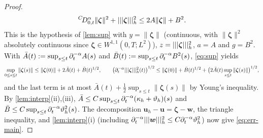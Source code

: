 \begin{proof}
\[
{}^{C}\!D_{0,t}^{\alpha}\|\bm\zeta\|^2+|||\bm\zeta|||_h^2\le2A\|\bm\zeta\|+B^2 .
\]
This is the hypothesis of \cref{lem:sup} with $y=\|\bm\zeta\|$ (continuous, with $\|\bm\zeta\|^2$ absolutely continuous since $\bm\zeta\in W^{1,1}(0,T;L^2)$), $z=|||\bm\zeta|||_h^2$, $a=A$ and $g=B^2$. With $\bar A(t):=\sup_{s\le t}\partial_t^{-\alpha} A(s)$ and $\bar B(t):=\sup_{s\le t}\partial_t^{-\alpha} B^2(s)$, \eqref{eq:sup} yields
\begin{equation}\label{eq:zeta-final}
\sup_{0\le s\le t}\|\bm\zeta(s)\|\le\|\bm\zeta(0)\|+2\bar A(t)+\bar B(t)^{1/2},\qquad
\bigl(\partial_t^{-\alpha}|||\bm\zeta|||_h^2(t)\bigr)^{1/2}\le\|\bm\zeta(0)\|+\bar B(t)^{1/2}+\bigl(2\bar A(t)\sup_{s\le t}\|\bm\zeta(s)\|\bigr)^{1/2},
\end{equation}
and the last term is at most $\bar A(t)+\frac12\sup_{s\le t}\|\bm\zeta(s)\|$ by Young's inequality. By \cref{lem:interp}(ii),(iii), $\bar A\le C\sup_{s\le t}\partial_t^{-\alpha}(\kappa_h+\vartheta_h)(s)$ and $\bar B\le C\sup_{s\le t}\partial_t^{-\alpha}\vartheta_h^2(s)$.
The decomposition $\bm u_h-\bm u=\bm\zeta-\bm w$, the triangle inequality, and \cref{lem:interp}(i) (including $\partial_t^{-\alpha}|||\bm w|||_h^2\le C\partial_t^{-\alpha}\vartheta_h^2$) now give \eqref{eq:err-main}.
\end{proof}
